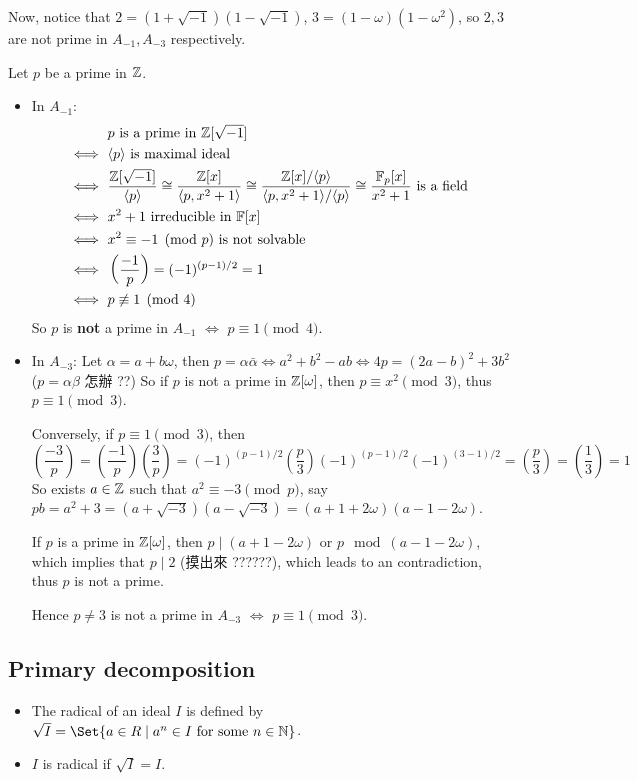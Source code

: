 Now, notice that $2 = (1 + \sqrt{-1})(1 - \sqrt{-1})$, $3 = (1 - \omega) (1 - \omega^2)$,
so $2, 3$ are not prime in $A_{-1}, A_{-3}$ respectively.

Let $p$ be a prime in $\mathbb{Z}$.
\begin{itemize}
  \item In $A_{-1}$:
    \begin{align*}
      & p \text{ is a prime in } \mathbb{Z}[\sqrt{-1}] \\
      \iff \ & \langle p\rangle \text{ is maximal ideal } \\
      \iff \ & \frac{\mathbb{Z}[\sqrt{-1}]}{\langle p\rangle} \cong \frac{\mathbb{Z}[x]}{\langle p, x^2+1\rangle}
      \cong \frac{\mathbb{Z}[x]/\langle p\rangle}{\langle p, x^2+1\rangle/\langle p\rangle} \cong \frac{\mathbb{F}_p[x]}{x^2+1}
      \text{ is a field } \\
      \iff \ & x^2 + 1 \text{ irreducible in } \mathbb{F}[x] \\
      \iff \ & x^2 \equiv -1 \pmod{p} \text{ is not solvable } \\
      \iff \ & \left(\frac{-1}{p}\right) = (-1)^{(p-1)/2} = 1 \\
      \iff \ & p \not\equiv 1 \pmod{4}
    \end{align*}
    So $p$ is {\bf not} a prime in $A_{-1}$ $\iff$ $p \equiv 1 \pmod{4}$.
  \item In $A_{-3}$: Let $\alpha = a + b \omega$, then
    $p = \alpha \bar{\alpha} \iff a^2 + b^2 - ab \iff 4p = (2a - b)^2 + 3b^2$
    ($p = \alpha \beta$ 怎辦 ??)
    So if $p$ is not a prime in $\mathbb{Z}[\omega]$, then $p \equiv x^2 \pmod{3}$,
    thus $p \equiv 1 \pmod{3}$.

    Conversely, if $p \equiv 1 \pmod{3}$, then
    \[ \left(\frac{-3}{p}\right)
      = \left(\frac{-1}{p}\right) \left(\frac{3}{p}\right)
      = (-1)^{(p-1)/2} \left(\frac{p}{3}\right) (-1)^{(p-1)/2} (-1)^{(3-1)/2}
      = \left(\frac{p}{3}\right) = \left(\frac{1}{3}\right) = 1 \]
    So exists $a \in \mathbb{Z}$ such that $a^2 \equiv -3 \pmod{p}$,
    say $pb = a^2 + 3 = (a + \sqrt{-3}) (a - \sqrt{-3}) = (a+1 + 2\omega) (a - 1 - 2\omega)$.

    If $p$ is a prime in $\mathbb{Z}[\omega]$, then $p \mid (a+1-2\omega)$ or $p \mod (a - 1 - 2\omega)$,
    which implies that $p \mid 2$ (摸出來 ??????), which leads to an contradiction,
    thus $p$ is not a prime.

    Hence $p \neq 3$ is not a prime in $A_{-3}$ $\iff$ $p \equiv 1 \pmod{3}$.
\end{itemize}


\subsection{Primary decomposition}
\begin{definition} \hfill
  \begin{itemize}
    \item The radical of an ideal $I$ is defined by $\sqrt{I} =
      \Set{ a \in R \mid a^n \in I \text{ for some } n \in \Nb}$.
    \item $I$ is radical if $\sqrt{I} = I$.
  \end{itemize}
\end{definition}

